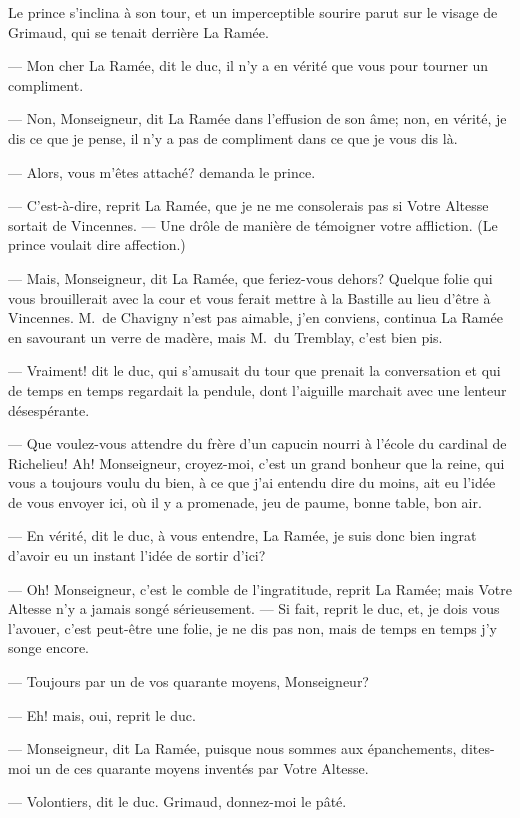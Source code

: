 Le prince s'inclina à son tour, et un imperceptible sourire parut sur le visage de Grimaud, qui se tenait derrière La Ramée.

— Mon cher La Ramée, dit le duc, il n'y a en vérité que vous pour tourner un compliment.

— Non, Monseigneur, dit La Ramée dans l'effusion de son âme; non, en vérité, je dis ce que je pense, il n'y a pas de compliment dans ce que je vous dis là.

— Alors, vous m'êtes attaché? demanda le prince.

— C'est-à-dire, reprit La Ramée, que je ne me consolerais pas si Votre Altesse sortait de Vincennes.
— Une drôle de manière de témoigner votre affliction. (Le prince voulait dire affection.)

— Mais, Monseigneur, dit La Ramée, que feriez-vous dehors? Quelque folie qui vous brouillerait avec la cour et vous ferait mettre à la Bastille au lieu d'être à Vincennes. M.~de Chavigny n'est pas aimable, j'en conviens, continua La Ramée en savourant un verre de madère, mais M.~du Tremblay, c'est bien pis.

— Vraiment! dit le duc, qui s'amusait du tour que prenait la conversation et qui de temps en temps regardait la pendule, dont l'aiguille marchait avec une lenteur désespérante.

— Que voulez-vous attendre du frère d'un capucin nourri à l'école du cardinal de Richelieu! Ah! Monseigneur, croyez-moi, c'est un grand bonheur que la reine, qui vous a toujours voulu du bien, à ce que j'ai entendu dire du moins, ait eu l'idée de vous envoyer ici, où il y a promenade, jeu de paume, bonne table, bon air.

— En vérité, dit le duc, à vous entendre, La Ramée, je suis donc bien ingrat d'avoir eu un instant l'idée de sortir d'ici?

— Oh! Monseigneur, c'est le comble de l'ingratitude, reprit La Ramée; mais Votre Altesse n'y a jamais songé sérieusement.
— Si fait, reprit le duc, et, je dois vous l'avouer, c'est peut-être une folie, je ne dis pas non, mais de temps en temps j'y songe encore.

— Toujours par un de vos quarante moyens, Monseigneur?

— Eh! mais, oui, reprit le duc.

— Monseigneur, dit La Ramée, puisque nous sommes aux épanchements, dites-moi un de ces quarante moyens inventés par Votre Altesse.

— Volontiers, dit le duc. Grimaud, donnez-moi le pâté.

